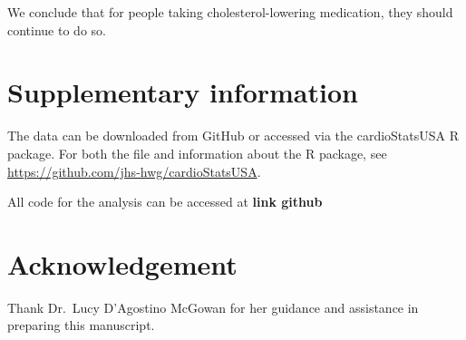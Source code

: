 \documentclass[useAMS,usenatbib,referee]{biom}
\begin{document}
We conclude that for people taking cholesterol-lowering medication, they
should continue to do so.

\hypertarget{supplement}{%
\section{Supplementary information}\label{supplement}}

The data can be downloaded from GitHub or accessed via the
cardioStatsUSA R package. For both the file and information about the R
package, see \url{https://github.com/jhs-hwg/cardioStatsUSA}.

All code for the analysis can be accessed at \textbf{link github}

\hypertarget{acknowledge}{%
\section{Acknowledgement}\label{acknowledge}}

Thank Dr.~Lucy D'Agostino McGowan for her guidance and assistance in
preparing this manuscript.






\label{lastpage}
\end{document}
